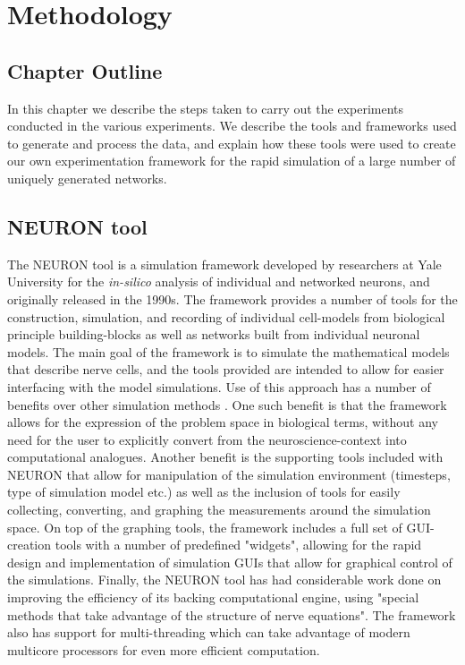 \chapter{Methodology}
\label{chap:meth}
\section*{Chapter Outline}
In this chapter we describe the steps taken to carry out the experiments conducted in the various experiments. We describe the tools and frameworks used to generate and process the data, and explain how these tools were used to create our own experimentation framework for the rapid simulation of a large number of uniquely generated networks.


\section{NEURON tool}
The NEURON tool is a simulation framework developed by researchers at Yale University for the \emph{in-silico} analysis of individual and networked neurons, and originally released in the 1990s. The framework provides a number of tools for the construction, simulation, and recording of individual cell-models from biological principle building-blocks as well as networks built from individual neuronal models. The main goal of the framework is to simulate the mathematical models that describe nerve cells, and the tools provided are intended to allow for easier interfacing with the model simulations. Use of this approach has a number of benefits over other simulation methods \cite{neuronSimEnv}. One such benefit is that the framework allows for the expression of the problem space in biological terms, without any need for the user to explicitly convert from the neuroscience-context into computational analogues. Another benefit is the supporting tools included with NEURON that allow for manipulation of the simulation environment (timesteps, type of simulation model etc.) as well as the inclusion of tools for easily collecting, converting, and graphing the measurements around the simulation space. On top of the graphing tools, the framework includes a full set of GUI-creation tools with a number of predefined "widgets", allowing for the rapid design and implementation of simulation GUIs that allow for graphical control of the simulations. Finally, the NEURON tool has had considerable work done on improving the efficiency of its backing computational engine, using "special methods that take advantage of the structure of nerve equations". The framework also has support for multi-threading which can take advantage of modern multicore processors for even more efficient computation.

